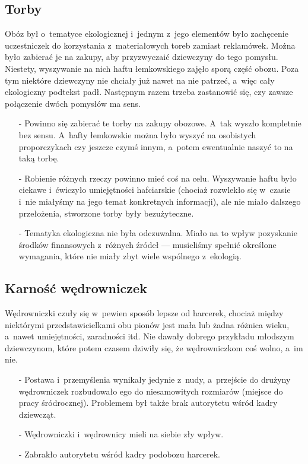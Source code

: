 \subsection{Torby}
Obóz był o~tematyce ekologicznej i~jednym z~jego elementów było zachęcenie uczestniczek do korzystania z~materiałowych toreb zamiast reklamówek. Można było zabierać je na zakupy, aby przyzwyczaić dziewczyny do tego pomysłu. Niestety, wyszywanie na nich haftu łemkowskiego zajęło sporą część obozu. Poza tym niektóre dziewczyny nie chciały już nawet na nie patrzeć, a~więc cały ekologiczny podtekst padł. Następnym razem trzeba zastanowić się, czy zawsze połączenie dwóch pomysłów ma sens.
\begin{itemize}
\item[-] Powinno się zabierać te torby na zakupy obozowe. A~tak wyszło kompletnie bez sensu. A~hafty łemkowskie można było wyszyć na osobistych proporczykach czy jeszcze czymś innym, a~potem ewentualnie naszyć to na taką torbę.
\item[-] Robienie różnych rzeczy powinno mieć coś na celu. Wyszywanie haftu było ciekawe i~ćwiczyło umiejętności hafciarskie (chociaż rozwlekło się w~czasie i~nie miałyśmy na jego temat konkretnych informacji), ale nie miało dalszego przełożenia, stworzone torby były bezużyteczne.
\item[-] Tematyka ekologiczna nie była odczuwalna. Miało na to wpływ pozyskanie środków finansowych z~różnych źródeł --- musieliśmy spełnić określone wymagania, które nie miały zbyt wiele wspólnego z~ekologią.
\end{itemize}
\subsection{Karność wędrowniczek}
Wędrowniczki czuły się w~pewien sposób lepsze od harcerek, chociaż między niektórymi przedstawicielkami obu pionów jest mała lub żadna różnica wieku, a~nawet umiejętności, zaradności itd. Nie dawały dobrego przykładu młodszym dziewczynom, które potem czasem dziwiły się, że wędrowniczkom coś wolno, a~im nie.
\begin{itemize}
\item[-] Postawa i~przemyślenia wynikały jedynie z~nudy, a~przejście do drużyny wędrowniczek rozbudowało ego do niesamowitych rozmiarów (miejsce do pracy śródrocznej). Problemem był także brak autorytetu wśród kadry dziewcząt.
\item[-] Wędrowniczki i~wędrownicy mieli na siebie zły wpływ.
\item[-] Zabrakło autorytetu wśród kadry podobozu harcerek.
\end{itemize}
